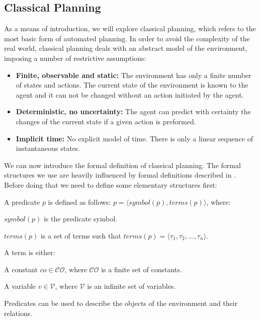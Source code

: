 \subsection{Classical Planning}

As a means of introduction, we will explore classical planning, 
which refers to the most basic form of automated planning.
In order to avoid the complexity of the real world, classical 
planning deals with an abstract model of the environment, 
imposing a number of restrictive assumptions:

\begin{itemize}
    \item 
    \textbf{Finite, observable and static:}
    The environment has only a finite number of states and actions. The current state of the environment is known to the agent and it can not be changed without an action initiated by the agent.

    \item 
    \textbf{Deterministic, no uncertainty:}
    The agent can predict with certainty the changes of the current state if a given action is preformed.

    \item 
    \textbf{Implicit time:}
    No explicit model of time. There is only a linear sequence of instantaneous states.
\end{itemize}

We can now introduce the formal definition of classical planning. 
The formal structures we use are heavily influenced by formal definitions 
described in \cite{AutomatedPlanningTheoryghallab2006}\cite{OverviewHierarchicalTaskgeorgievski2014}\cite{alnazer2019htn}. 
Before doing that we need to define some elementary structures first:


\begin{Tdef}[Predicate]
    A predicate $p$ is defined as follows: $p= \langle symbol(p), terms(p) \rangle$, where:
    \vspace{-0.5em}
    \begin{compactitem} 
        \item 
        $symbol(p)$ is the predicate symbol.
        \item 
        $terms(p)$ is a set of terms such that $terms(p) = \langle \tau_1, \tau_2, \dots, \tau_n \rangle$.
        \item 
        A term is either:
        \begin{compactitem}
            \item 
            A constant $co \in \mathcal{CO}$, where $\mathcal{CO}$ is a finite set of constants.
            \item 
            A variable $v \in \mathcal{V}$, where $\mathcal{V}$ is an infinite set of variables.
        \end{compactitem}
    \end{compactitem}
    \vspace{-0.5em}
    Predicates can be used to describe the objects of the environment and their relations.
\end{Tdef}

